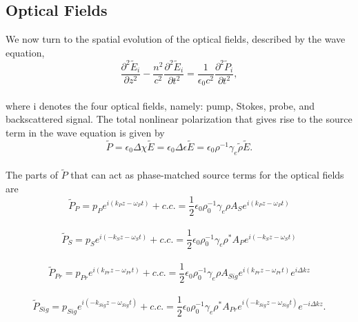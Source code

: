 \documentclass[%
  reprint,
  superscriptaddress,
  amsmath,amssymb,
  aps,
  prapplied,
]{revtex4-2}
\begin{document}
\subsection{Optical Fields}
\label{Coupled-Wave Equations:Optical Fields}

We now turn to the spatial evolution of the optical fields, described by the wave equation,
\\
\begin{equation}
    \frac{\partial^{2}\tilde{E}_{i}}{\partial z^{2}} - \frac{n^{2}}{c^{2}}\frac{\partial^{2}\tilde{E}_{i}}{\partial t^{2}} = \frac{1}{\epsilon_{0}c^{2}}\frac{\partial^{2}\tilde{P}_{i}}{\partial t^{2}},
    \label{eq:Wave equation}
\end{equation}
\\
where i denotes the four optical fields, namely: pump, Stokes, probe, and backscattered signal. The total nonlinear polarization that gives rise to the source term in the wave equation is given by
\\
\begin{equation}
    \tilde{P} = \epsilon_{0}\Delta\chi\tilde{E} = \epsilon_{0}\Delta\epsilon\tilde{E} = \epsilon_{0}\rho^{-1}\gamma_{e}\tilde{\rho}\tilde{E}.
\end{equation}
\\
The parts of $\tilde{P}$ that can act as phase-matched source terms for the optical fields are
\\
\begin{equation}
    \tilde{P}_{P} = p_{P}e^{i(k_{P}z - \omega_{P} t)} + c.c. = \frac{1}{2}\epsilon_{0}\rho_{0}^{-1}\gamma_{e}\rho A_{S}e^{i(k_{P}z - \omega_{P} t)}
    \label{eq:Pump phase-matched source term}
\end{equation}
\\
\begin{equation}
    \tilde{P}_{S} = p_{S}e^{i(-k_{S}z - \omega_{S} t)} + c.c. = \frac{1}{2}\epsilon_{0}\rho_{0}^{-1}\gamma_{e}\rho^{*} A_{P}e^{i(-k_{S}z - \omega_{S} t)}
    \label{eq:Stokes phase-matched source term}
\end{equation}
\\
\begin{equation}
    \tilde{P}_{Pr} = p_{Pr}e^{i(k_{Pr}z - \omega_{Pr} t)} + c.c. = \frac{1}{2}\epsilon_{0}\rho_{0}^{-1}\gamma_{e}\rho A_{Sig}e^{i(k_{Pr}z - \omega_{Pr} t)}e^{i\Delta kz}
    \label{eq:Probe phase-matched source term}
\end{equation}
\\
\begin{equation}
    \tilde{P}_{Sig} = p_{Sig}e^{i(-k_{Sig}z - \omega_{Sig} t)} + c.c. = \frac{1}{2}\epsilon_{0}\rho_{0}^{-1}\gamma_{e}\rho^{*} A_{Pr}e^{i(-k_{Sig}z - \omega_{Sig} t)}e^{-i\Delta kz}.
    \label{eq:Signal phase-matched source term}
\end{equation}
\end{document}
